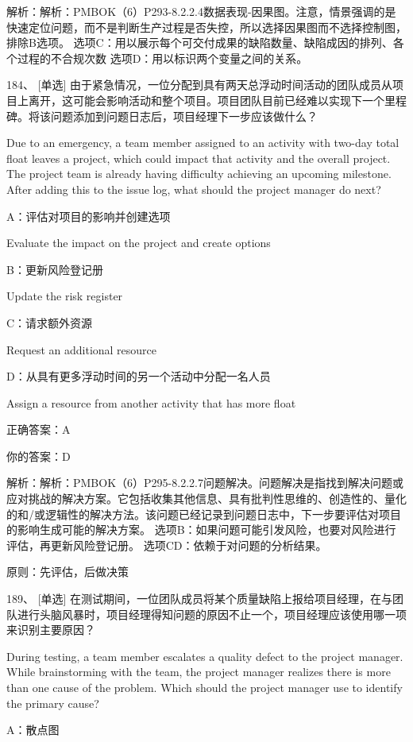 解析：解析：PMBOK（6）P293-8.2.2.4数据表现-因果图。注意，情景强调的是快速定位问题，而不是判断生产过程是否失控，所以选择因果图而不选择控制图，排除B选项。 选项C：用以展示每个可交付成果的缺陷数量、缺陷成因的排列、各个过程的不合规次数 选项D：用以标识两个变量之间的关系。


184、 [单选] 由于紧急情况，一位分配到具有两天总浮动时间活动的团队成员从项目上离开，这可能会影响活动和整个项目。项目团队目前已经难以实现下一个里程碑。将该问题添加到问题日志后，项目经理下一步应该做什么？

Due to an emergency, a team member assigned to an activity with two-day total float leaves a project, which could impact that activity and the overall project. The project team is already having difficulty achieving an upcoming milestone. After adding this to the issue log, what should the project manager do next?

A：评估对项目的影响并创建选项

Evaluate the impact on the project and create options

B：更新风险登记册

Update the risk register

C：请求额外资源

Request an additional resource

D：从具有更多浮动时间的另一个活动中分配一名人员

Assign a resource from another activity that has more float

正确答案：A

你的答案：D

解析：解析：PMBOK（6）P295-8.2.2.7问题解决。问题解决是指找到解决问题或应对挑战的解决方案。它包括收集其他信息、具有批判性思维的、创造性的、量化的和/或逻辑性的解决方法。该问题已经记录到问题日志中，下一步要评估对项目的影响生成可能的解决方案。 选项B：如果问题可能引发风险，也要对风险进行评估，再更新风险登记册。 选项CD：依赖于对问题的分析结果。

原则：先评估，后做决策


189、 [单选] 在测试期间，一位团队成员将某个质量缺陷上报给项目经理，在与团队进行头脑风暴时，项目经理得知问题的原因不止一个，项目经理应该使用哪一项来识别主要原因？

During testing, a team member escalates a quality defect to the project manager. While brainstorming with the team, the project manager realizes there is more than one cause of the problem. Which should the project manager use to identify the primary cause?

A：散点图

